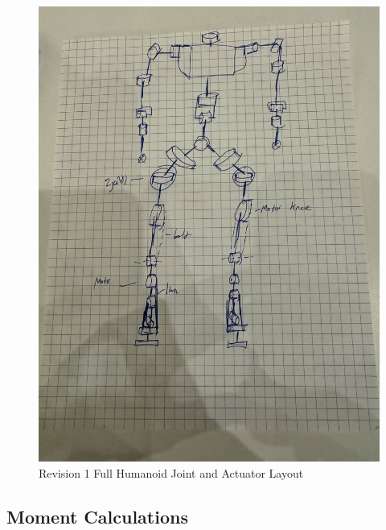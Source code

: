 \documentclass{article}
\begin{document}
\begin{figure}[H]
    \centering
    \includegraphics[scale=0.1]{assets/Design Presentation/Layout Rev2.jpg}
    \caption{Revision 1 Full Humanoid Joint and Actuator Layout}
    \label{fig:enter-label}
\end{figure}

\newpage

\subsection{Moment Calculations}
\end{document}
